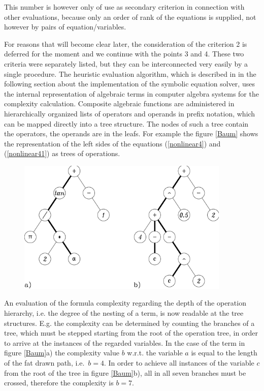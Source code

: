 This number is however only of use as secondary criterion in connection with other evaluations, because only an order of rank of the equations is supplied, not however by pairs of equation/variables.

For reasons that will become clear later, 
the consideration of the criterion 2  is deferred for the moment and we continue with the points 3 and 4. These two criteria were separately listed, but they can be interconnected very easily by a single procedure. The heuristic evaluation algorithm, which is described in in the following section about the implementation of the symbolic equation solver, uses the internal representation of algebraic terms in computer algebra systems for the complexity calculation. 
Composite algebraic functions are administered in hierarchically organized lists of operators and operands in prefix notation,  which can be mapped directly into a tree structure. The nodes of such a tree contain the operators, the operands are in the leafs. For example the figure \ref{Baum} shows the representation of the left sides of the equations (\ref{nonlinear4}) and (\ref{nonlinear41}) as trees of operations.
\begin {figure} [htbp]
\begin {center}
\includegraphics[height=6.4cm]{BAUM.png}
\caption {}%
\end {center}
\end {figure}

An evaluation of the formula complexity regarding the depth of the operation hierarchy, i.e. the degree of the nesting of a term, is now readable at the tree structures. E.g. the complexity can be determined by counting  the branches of a tree, which must be stepped starting from the root of the operation tree, in order to arrive at the instances of the regarded variables.
 In the case of the term in figure \ref{Baum}a) the complexity value $b$ w.r.t. the variable $a$ is equal to the length of the fat drawn path, i.e.\ $b = 4$. In order to achieve all instances of the variable $c$ from the root of the tree in figure  \ref{Baum}b), all in all seven branches must be crossed, therefore the complexity is $b=7$.
 
